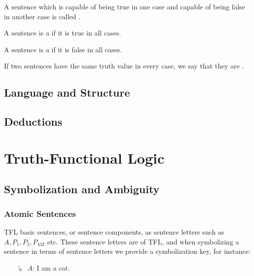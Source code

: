 \documentclass[12pt, a4paper, oneside, openright, titlepage]{book}
\begin{document}
\begin{defn}[Contingent]{}
    A sentence which is capable of being true in one case and capable of being false in another case is called .
\end{defn}

\begin{defn}
    A sentence is a  if it is true in all cases.
\end{defn}

\begin{defn}
    A sentence is a  if it is false in all cases.
\end{defn}

\begin{defn}
    If two sentences have the same truth value in every case, we say that they are .
\end{defn}





\chapter{\textsection\textsection Language and Structure}


\chapter{\textsection\textsection Deductions}


\part{Truth-Functional Logic}


\chapter{\textsection\textsection Symbolization and Ambiguity}

\section{\textsection Atomic Sentences}

\begin{defn}
    TFL  basic sentences, or sentence components, as sentence letters such as $A,P_1,P_2,P_{432}$ etc. These sentence letters are  of TFL, and when symbolizing a sentence in terms of sentence letters we provide a symbolization key, for instance:\begin{enumerate}
        \item[$\drsh$] $A$: I am a cat.
    \end{enumerate}
\end{defn}
\end{document}
